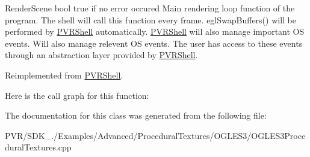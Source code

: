   Render\+Scene  bool true if no error occured  Main rendering loop function of the program. The shell will call this function every frame. egl\+Swap\+Buffers() will be performed by \hyperlink{class_p_v_r_shell}{P\+V\+R\+Shell} automatically. \hyperlink{class_p_v_r_shell}{P\+V\+R\+Shell} will also manage important O\+S events. Will also manage relevent O\+S events. The user has access to these events through an abstraction layer provided by \hyperlink{class_p_v_r_shell}{P\+V\+R\+Shell}. 

Reimplemented from \hyperlink{class_p_v_r_shell_ae0eb5f797cbe993a22b8659f9c332578}{P\+V\+R\+Shell}.



Here is the call graph for this function\+:




The documentation for this class was generated from the following file\+:\begin{DoxyCompactItemize}
\item 
P\+V\+R/\+S\+D\+K\+\_./\+Examples/\+Advanced/\+Procedural\+Textures/\+O\+G\+L\+E\+S3/O\+G\+L\+E\+S3\+Procedural\+Textures.\+cpp\end{DoxyCompactItemize}
